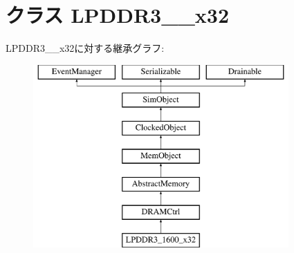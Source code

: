 \hypertarget{classDRAMCtrl_1_1LPDDR3__1600__x32}{
\section{クラス LPDDR3\_\_\-x32}
\label{classDRAMCtrl_1_1LPDDR3__1600__x32}
}
LPDDR3\_\_\-x32に対する継承グラフ:\begin{figure}[H]
\begin{center}
\leavevmode
\includegraphics[height=7cm]{classDRAMCtrl_1_1LPDDR3__1600__x32}
\end{center}
\end{figure}
